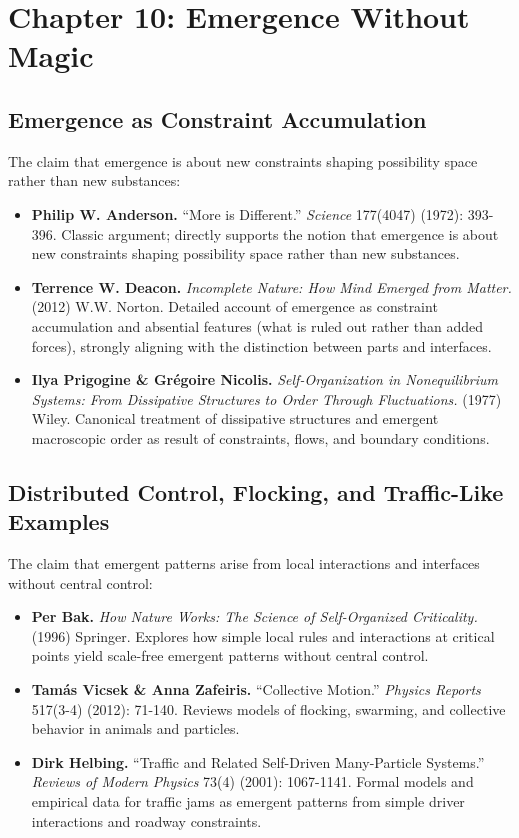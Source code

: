 \documentclass[
  openright]{book}
\begin{document}
\section{Chapter 10: Emergence Without
Magic}\label{chapter-10-emergence-without-magic}

\subsection{Emergence as Constraint
Accumulation}\label{emergence-as-constraint-accumulation-1}

The claim that emergence is about new constraints shaping possibility
space rather than new substances:

\begin{itemize}
\item
  \textbf{Philip W. Anderson.} ``More is Different.'' \emph{Science}
  177(4047) (1972): 393-396. Classic argument; directly supports the
  notion that emergence is about new constraints shaping possibility
  space rather than new substances.
\item
  \textbf{Terrence W. Deacon.} \emph{Incomplete Nature: How Mind Emerged
  from Matter.} (2012) W.W. Norton. Detailed account of emergence as
  constraint accumulation and absential features (what is ruled out
  rather than added forces), strongly aligning with the distinction
  between parts and interfaces.
\item
  \textbf{Ilya Prigogine \& Grégoire Nicolis.} \emph{Self-Organization
  in Nonequilibrium Systems: From Dissipative Structures to Order
  Through Fluctuations.} (1977) Wiley. Canonical treatment of
  dissipative structures and emergent macroscopic order as result of
  constraints, flows, and boundary conditions.
\end{itemize}

\subsection{Distributed Control, Flocking, and Traffic-Like
Examples}\label{distributed-control-flocking-and-traffic-like-examples}

The claim that emergent patterns arise from local interactions and
interfaces without central control:

\begin{itemize}
\item
  \textbf{Per Bak.} \emph{How Nature Works: The Science of
  Self-Organized Criticality.} (1996) Springer. Explores how simple
  local rules and interactions at critical points yield scale-free
  emergent patterns without central control.
\item
  \textbf{Tamás Vicsek \& Anna Zafeiris.} ``Collective Motion.''
  \emph{Physics Reports} 517(3-4) (2012): 71-140. Reviews models of
  flocking, swarming, and collective behavior in animals and particles.
\item
  \textbf{Dirk Helbing.} ``Traffic and Related Self-Driven Many-Particle
  Systems.'' \emph{Reviews of Modern Physics} 73(4) (2001): 1067-1141.
  Formal models and empirical data for traffic jams as emergent patterns
  from simple driver interactions and roadway constraints.
\end{itemize}
\end{document}
